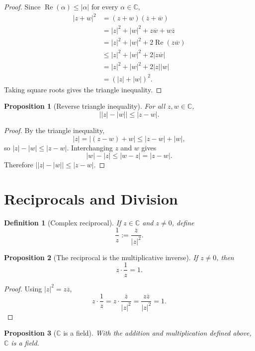 \documentclass[11pt]{article}
\newtheorem{definition}{Definition}[section]
\newtheorem{proposition}{Proposition}[section]
\newcommand{\C}{\mathbb{C}}
\newcommand{\abs}[1]{\left|#1\right|}
\newcommand{\conj}[1]{\overline{#1}}
\newcommand{\Real}{\operatorname{Re}}
\begin{document}
\begin{proof}
Since $\Real(\alpha)\le \abs{\alpha}$ for every $\alpha\in\C$,
\[
\begin{aligned}
  \abs{z+w}^{2}
    &= (z+w)(\conj{z}+\conj{w}) \\
    &= \abs{z}^{2}+\abs{w}^{2}+z\conj{w}+w\conj{z} \\
    &= \abs{z}^{2}+\abs{w}^{2}+2\Real(z\conj{w}) \\
    &\le \abs{z}^{2}+\abs{w}^{2}+2\abs{z\conj{w}} \\
    &= \abs{z}^{2}+\abs{w}^{2}+2\abs{z}\abs{w} \\
    &= (\abs{z}+\abs{w})^{2}.
\end{aligned}
\]
Taking square roots gives the triangle inequality.
\end{proof}

\begin{proposition}[Reverse triangle inequality]
For all $z,w\in\C$,
\[
  \bigl|\abs{z}-\abs{w}\bigr|\le \abs{z-w}.
\]
\end{proposition}

\begin{proof}
By the triangle inequality,
\[
  \abs{z}=\abs{(z-w)+w}\le \abs{z-w}+\abs{w},
\]
so $\abs{z}-\abs{w}\le \abs{z-w}$.
Interchanging $z$ and $w$ gives
\[
  \abs{w}-\abs{z}\le \abs{w-z}=\abs{z-w}.
\]
Therefore $\bigl|\abs{z}-\abs{w}\bigr|\le \abs{z-w}$.
\end{proof}

\section{Reciprocals and Division}

\begin{definition}[Complex reciprocal]
If $z\in\C$ and $z\ne0$, define
\[
  \frac{1}{z}:=\frac{\conj{z}}{\abs{z}^{2}}.
\]
\end{definition}

\begin{proposition}[The reciprocal is the multiplicative inverse]
If $z\ne0$, then
\[
  z\cdot\frac{1}{z}=1.
\]
\end{proposition}

\begin{proof}
Using $\abs{z}^{2}=z\conj{z}$,
\[
  z\cdot\frac{1}{z}
  = z\cdot\frac{\conj{z}}{\abs{z}^{2}}
  = \frac{z\conj{z}}{\abs{z}^{2}}
  = 1.
\]
\end{proof}

\begin{proposition}[$\C$ is a field]
With the addition and multiplication defined above, $\C$ is a field.
\end{proposition}
\end{document}
